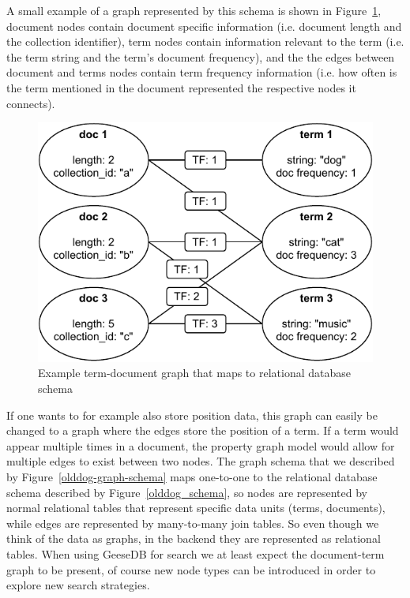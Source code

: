 A small example of a graph represented by this schema is shown in Figure~\ref{example-olddog-graph}, document nodes contain document specific information (i.e. document length and the collection identifier), term nodes contain information relevant to the term (i.e. the term string and the term's document frequency), and the the edges between document and terms nodes contain term frequency information (i.e. how often is the term mentioned in the document represented the respective nodes it connects).
\begin{figure}[!h]
	\centering
	\includegraphics[width=\linewidth]{./imgs/example_olddog_graph.pdf}
	\caption{Example term-document graph that maps to relational database schema}
	\label{example-olddog-graph}
\end{figure}
If one wants to for example also store position data, this graph can easily be changed to a graph where the edges store the position of a term. If a term would appear multiple times in a document, the property graph model would allow for multiple edges to exist between two nodes. The graph schema that we described by Figure~\ref{olddog-graph-schema} maps one-to-one to the relational database schema described by Figure~\ref{olddog_schema}, so nodes are represented by normal relational tables that represent specific data units (terms, documents), while edges are represented by many-to-many join tables. So even though we think of the data as graphs, in the backend they are represented as relational tables. When using GeeseDB for search we at least expect the document-term graph to be present, of course new node types can be introduced in order to explore new search strategies. 

